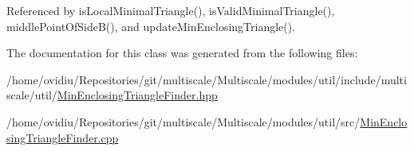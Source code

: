 Referenced by is\-Local\-Minimal\-Triangle(), is\-Valid\-Minimal\-Triangle(), middle\-Point\-Of\-Side\-B(), and update\-Min\-Enclosing\-Triangle().



The documentation for this class was generated from the following files\-:\begin{DoxyCompactItemize}
\item 
/home/ovidiu/\-Repositories/git/multiscale/\-Multiscale/modules/util/include/multiscale/util/\hyperlink{MinEnclosingTriangleFinder_8hpp}{Min\-Enclosing\-Triangle\-Finder.\-hpp}\item 
/home/ovidiu/\-Repositories/git/multiscale/\-Multiscale/modules/util/src/\hyperlink{MinEnclosingTriangleFinder_8cpp}{Min\-Enclosing\-Triangle\-Finder.\-cpp}\end{DoxyCompactItemize}
